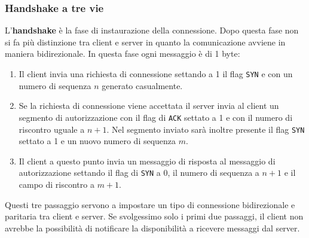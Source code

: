 \subsubsection{Handshake a tre vie}
L'\textbf{handshake} è la fase di instaurazione della connessione. Dopo questa fase non si fa più
distinzione tra client e server in quanto la comunicazione avviene in maniera bidirezionale. In
questa fase ogni messaggio è di 1 byte:
\begin{enumerate}
	\item Il client invia una richiesta di connessione settando a 1 il flag \verb|SYN| e con un
	      numero di sequenza $n$ generato casualmente.
	\item Se la richiesta di connessione viene accettata il server invia al client un segmento di
	      autorizzazione con il flag di \verb|ACK| settato a 1 e con il numero di riscontro uguale
	      a $n+1$. Nel segmento inviato sarà inoltre presente il flag \verb|SYN| settato a 1 e un
	      nuovo numero di sequenza $m$.
	\item Il client a questo punto invia un messaggio di risposta al messaggio di autorizzazione
	      settando il flag di \verb|SYN| a 0, il numero di sequenza a $n+1$ e il campo di riscontro
	      a $m+1$.
\end{enumerate}
Questi tre passaggio servono a impostare un tipo di connessione bidirezionale e paritaria tra
client e server. Se svolgessimo solo i primi due passaggi, il client non avrebbe la possibilità
di notificare la disponibilità a ricevere messaggi dal server.

